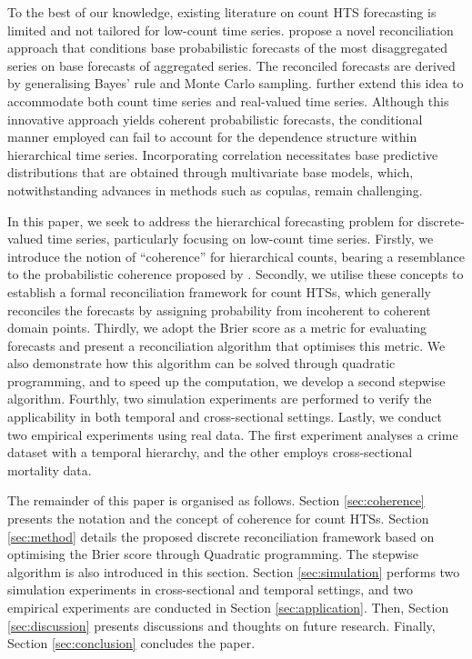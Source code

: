 \documentclass[a4paper,review,12pt,authoryear]{elsarticle}
\theoremstyle{definition}
\begin{document}
To the best of our knowledge, existing literature on count HTS forecasting is limited and not tailored for low-count time series.
\cite{coraniProbabilisticReconciliationCount2022} propose a novel reconciliation approach that conditions base probabilistic forecasts of the most disaggregated series on base forecasts of aggregated series.
The reconciled forecasts are derived by generalising Bayes’ rule and Monte Carlo sampling.
\cite{zambonEfficientProbabilisticReconciliation2022} further extend this idea to accommodate both count time series and real-valued time series.
Although this innovative approach yields coherent probabilistic forecasts,
the conditional manner employed can fail to account for the dependence structure within hierarchical time series.
Incorporating correlation necessitates base predictive distributions that are obtained through multivariate base models, which, notwithstanding advances in methods such as copulas, remain challenging.

In this paper, we seek to address the hierarchical forecasting problem for discrete-valued time series, particularly focusing on low-count time series.
Firstly, we introduce the notion of ``coherence'' for hierarchical counts,
bearing a resemblance to the probabilistic coherence proposed by \cite{panagiotelisProbabilisticForecastReconciliation2022}.
Secondly, we utilise these concepts to establish a formal reconciliation framework for count HTSs, which generally reconciles the forecasts by assigning probability from incoherent to coherent domain points.
Thirdly, we adopt the Brier score as a metric for evaluating forecasts and present a reconciliation algorithm that optimises this metric.
We also demonstrate how this algorithm can be solved through quadratic programming, and to speed up the computation, we develop a second stepwise algorithm.
Fourthly, two simulation experiments are performed to verify the applicability in both temporal and cross-sectional settings.
Lastly, we conduct two empirical experiments using real data. The first experiment analyses a crime dataset with a temporal hierarchy, and the other employs cross-sectional mortality data.

The remainder of this paper is organised as follows.
Section \ref{sec:coherence} presents the notation and the concept of coherence for count HTSs.
Section \ref{sec:method} details the proposed discrete reconciliation framework based on optimising the Brier score through Quadratic programming. The stepwise algorithm is also introduced in this section.
Section \ref{sec:simulation} performs two simulation experiments in cross-sectional and temporal settings, and two empirical experiments are conducted in Section \ref{sec:application}.
Then, Section \ref{sec:discussion} presents discussions and thoughts on future research. 
Finally, Section \ref{sec:conclusion} concludes the paper.
\end{document}
